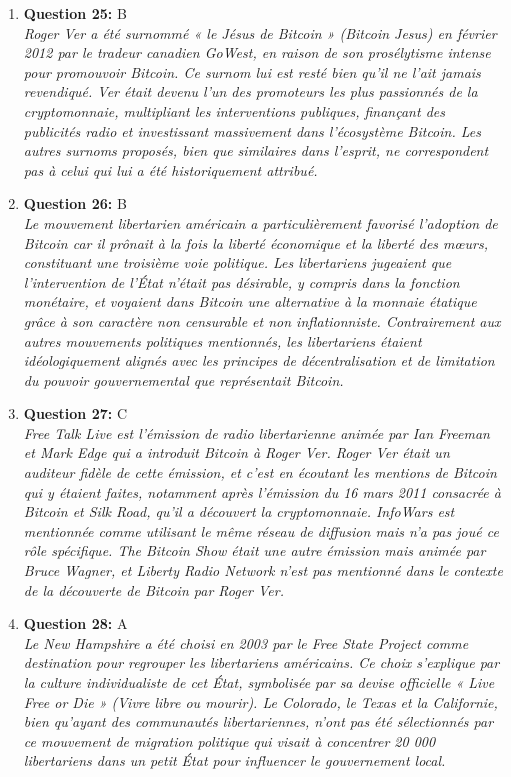\documentclass[12pt,a4paper]{article}
\begin{document}
\begin{enumerate}
\item \textbf{Question 25:} B
\\ \textit{Roger Ver a été surnommé « le Jésus de Bitcoin » (Bitcoin Jesus) en février 2012 par le tradeur canadien GoWest, en raison de son prosélytisme intense pour promouvoir Bitcoin. Ce surnom lui est resté bien qu'il ne l'ait jamais revendiqué. Ver était devenu l'un des promoteurs les plus passionnés de la cryptomonnaie, multipliant les interventions publiques, finançant des publicités radio et investissant massivement dans l'écosystème Bitcoin. Les autres surnoms proposés, bien que similaires dans l'esprit, ne correspondent pas à celui qui lui a été historiquement attribué.}

\item \textbf{Question 26:} B
\\ \textit{Le mouvement libertarien américain a particulièrement favorisé l'adoption de Bitcoin car il prônait à la fois la liberté économique et la liberté des mœurs, constituant une troisième voie politique. Les libertariens jugeaient que l'intervention de l'État n'était pas désirable, y compris dans la fonction monétaire, et voyaient dans Bitcoin une alternative à la monnaie étatique grâce à son caractère non censurable et non inflationniste. Contrairement aux autres mouvements politiques mentionnés, les libertariens étaient idéologiquement alignés avec les principes de décentralisation et de limitation du pouvoir gouvernemental que représentait Bitcoin.}

\item \textbf{Question 27:} C
\\ \textit{Free Talk Live est l'émission de radio libertarienne animée par Ian Freeman et Mark Edge qui a introduit Bitcoin à Roger Ver. Roger Ver était un auditeur fidèle de cette émission, et c'est en écoutant les mentions de Bitcoin qui y étaient faites, notamment après l'émission du 16 mars 2011 consacrée à Bitcoin et Silk Road, qu'il a découvert la cryptomonnaie. InfoWars est mentionnée comme utilisant le même réseau de diffusion mais n'a pas joué ce rôle spécifique. The Bitcoin Show était une autre émission mais animée par Bruce Wagner, et Liberty Radio Network n'est pas mentionné dans le contexte de la découverte de Bitcoin par Roger Ver.}

\item \textbf{Question 28:} A
\\ \textit{Le New Hampshire a été choisi en 2003 par le Free State Project comme destination pour regrouper les libertariens américains. Ce choix s'explique par la culture individualiste de cet État, symbolisée par sa devise officielle « Live Free or Die » (Vivre libre ou mourir). Le Colorado, le Texas et la Californie, bien qu'ayant des communautés libertariennes, n'ont pas été sélectionnés par ce mouvement de migration politique qui visait à concentrer 20 000 libertariens dans un petit État pour influencer le gouvernement local.}


\end{enumerate}
\end{document}
